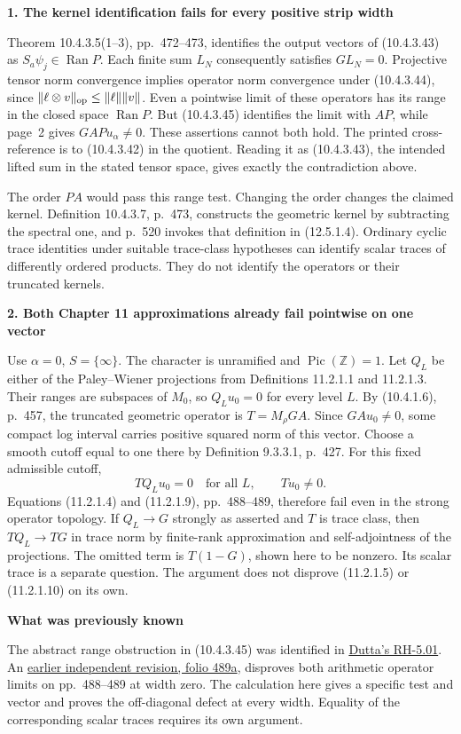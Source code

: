 \documentclass[11pt]{article}
\newcommand{\Z}{\mathbb Z}\newcommand{\A}{\mathbb A}
\newcommand{\topic}[1]{\par\medskip\textbf{#1}\par}
\newcommand{\page}[1]{\newpage{\Large\bfseries\color{ink}#1}\par\smallskip}
\begin{document}
\page{Three consequences for the printed theorems}
\topic{1. The kernel identification fails for every positive strip width}
Theorem 10.4.3.5(1--3), pp.~472--473, identifies the output vectors of (10.4.3.43) as \(S_a\psi_j\in\operatorname{Ran}P\). Each finite sum \(L_N\) consequently satisfies \(G L_N=0\). Projective tensor norm convergence implies operator norm convergence under (10.4.3.44), since \(\|\ell\otimes v\|_{\rm op}\le\|\ell\|\|v\|\). Even a pointwise limit of these operators has its range in the closed space \(\operatorname{Ran}P\). But (10.4.3.45) identifies the limit with \(AP\), while page~2 gives \(GAPu_\alpha\ne0\). These assertions cannot both hold. The printed cross-reference is to (10.4.3.42) in the quotient. Reading it as (10.4.3.43), the intended lifted sum in the stated tensor space, gives exactly the contradiction above.

The order \(PA\) would pass this range test. Changing the order changes the claimed kernel. Definition 10.4.3.7, p.~473, constructs the geometric kernel by subtracting the spectral one, and p.~520 invokes that definition in (12.5.1.4). Ordinary cyclic trace identities under suitable trace-class hypotheses can identify scalar traces of differently ordered products. They do not identify the operators or their truncated kernels.
\topic{2. Both Chapter 11 approximations already fail pointwise on one vector}
Use \(\alpha=0\), \(S=\{\infty\}\). The character is unramified and \(\operatorname{Pic}(\Z)=1\). Let \(Q_L\) be either of the Paley--Wiener projections from Definitions 11.2.1.1 and 11.2.1.3. Their ranges are subspaces of \(M_0\), so \(Q_Lu_0=0\) for every level \(L\). By (10.4.1.6), p.~457, the truncated geometric operator is \(T=M_\rho GA\). Since \(GAu_0\ne0\), some compact log interval carries positive squared norm of this vector. Choose a smooth cutoff equal to one there by Definition 9.3.3.1, p.~427. For this fixed admissible cutoff,
\[
                  TQ_Lu_0=0\quad\text{for all }L,\qquad Tu_0\ne0 .
\]
Equations (11.2.1.4) and (11.2.1.9), pp.~488--489, therefore fail even in the strong operator topology. If \(Q_L\to G\) strongly as asserted and \(T\) is trace class, then \(TQ_L\to TG\) in trace norm by finite-rank approximation and self-adjointness of the projections. The omitted term is \(T(1-G)\), shown here to be nonzero. Its scalar trace is a separate question. The argument does not disprove (11.2.1.5) or (11.2.1.10) on its own.
\topic{What was previously known}
The abstract range obstruction in (10.4.3.45) was identified in \href{https://github.com/SanchayanDutta/masullo-rh/blob/5e539d64bddc9420c099956521a02531e306d3de/bugs/RH-5.01-projection-order-and-spectral-range.md}{Dutta's RH-5.01}. An \href{https://github.com/Titulus233/The-Music-of-the-Primes-Revise/blob/4a9ad5765d4a2dfb237f874695ee4f4a07817867/src/the-music-of-the-primes-revised.tex}{earlier independent revision, folio 489a}, disproves both arithmetic operator limits on pp.~488--489 at width zero. The calculation here gives a specific test and vector and proves the off-diagonal defect at every width. Equality of the corresponding scalar traces requires its own argument.
\end{document}
